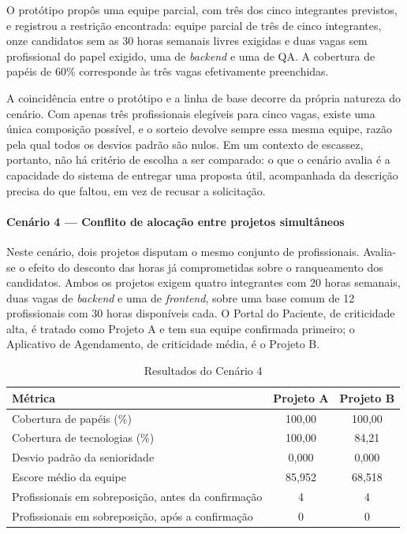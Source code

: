 O protótipo propôs uma equipe parcial, com três dos cinco integrantes previstos, e registrou a restrição encontrada: equipe parcial de três de cinco integrantes, onze candidatos sem as 30 horas semanais livres exigidas e duas vagas sem profissional do papel exigido, uma de \textit{backend} e uma de QA. A cobertura de papéis de 60\% corresponde às três vagas efetivamente preenchidas.

A coincidência entre o protótipo e a linha de base decorre da própria natureza do cenário. Com apenas três profissionais elegíveis para cinco vagas, existe uma única composição possível, e o sorteio devolve sempre essa mesma equipe, razão pela qual todos os desvios padrão são nulos. Em um contexto de escassez, portanto, não há critério de escolha a ser comparado: o que o cenário avalia é a capacidade do sistema de entregar uma proposta útil, acompanhada da descrição precisa do que faltou, em vez de recusar a solicitação.

\paragraph{Cenário 4 — Conflito de alocação entre projetos simultâneos}

Neste cenário, dois projetos disputam o mesmo conjunto de profissionais. Avalia-se o efeito do desconto das horas já comprometidas sobre o ranqueamento dos candidatos. Ambos os projetos exigem quatro integrantes com 20 horas semanais, duas vagas de \textit{backend} e uma de \textit{frontend}, sobre uma base comum de 12 profissionais com 30 horas disponíveis cada. O Portal do Paciente, de criticidade alta, é tratado como Projeto A e tem sua equipe confirmada primeiro; o Aplicativo de Agendamento, de criticidade média, é o Projeto B.

\begin{table}[htbp]
\centering
\caption{Resultados do Cenário 4}
\label{tab:cenario4}
\begin{tabular}{lcc}
\hline
\textbf{Métrica} & \textbf{Projeto A} & \textbf{Projeto B} \\
\hline
Cobertura de papéis (\%) & 100,00 & 100,00 \\
Cobertura de tecnologias (\%) & 100,00 & 84,21 \\
Desvio padrão da senioridade & 0,000 & 0,000 \\
Escore médio da equipe & 85,952 & 68,518 \\
Profissionais em sobreposição, antes da confirmação & 4 & 4 \\
Profissionais em sobreposição, após a confirmação & 0 & 0 \\
\hline
\end{tabular}
\end{table}

